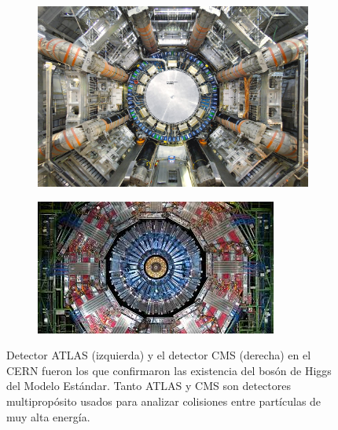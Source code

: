 \documentclass[12pt,a4paper]{report}
\begin{document}
\begin{figure}
\begin{subfigure}{0.5\textwidth}
	\includegraphics[scale=0.27]{images/atlas.jpg}
\end{subfigure}	
\begin{subfigure}{0.5\textwidth}
	\includegraphics[scale=0.9]{images/cms.jpeg}
\end{subfigure}	
\caption{Detector ATLAS (izquierda) y el detector CMS (derecha) en el CERN fueron los que confirmaron las existencia del bos\'on de Higgs del Modelo Est\'andar. Tanto ATLAS y CMS son detectores multiprop\'osito usados para analizar colisiones entre part\'iculas de muy alta energ\'ia.}
\end{figure}
\end{document}
